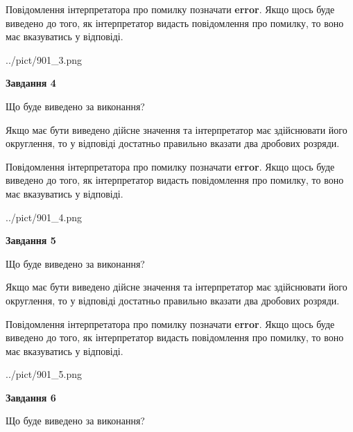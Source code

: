 \documentclass[12pt, ukrainian]{article}
\begin{document}
{\begin {Large}
Повідомлення інтерпретатора про помилку позначати \textbf{error}.
Якщо щось буде виведено до того, як інтерпретатор видасть повідомлення про помилку, 
то воно має вказуватись у відповіді. \par

\begin{center}
	{../pict/901_3.png}
\end{center}
\newpage

{\begin {center}\textbf{Завдання 4}\end {center}}\par
Що буде виведено за виконання? \par

Якщо має бути виведено дійсне значення та інтерпретатор має здійснювати його округлення, 
то у відповіді достатньо правильно вказати два дробових розряди.

Повідомлення інтерпретатора про помилку позначати \textbf{error}.
Якщо щось буде виведено до того, як інтерпретатор видасть повідомлення про помилку, 
то воно має вказуватись у відповіді. \par

\begin{center}
	{../pict/901_4.png}
\end{center}
\newpage

{\begin {center}\textbf{Завдання 5}\end {center}}\par
Що буде виведено за виконання? \par

Якщо має бути виведено дійсне значення та інтерпретатор має здійснювати його округлення, 
то у відповіді достатньо правильно вказати два дробових розряди.

Повідомлення інтерпретатора про помилку позначати \textbf{error}.
Якщо щось буде виведено до того, як інтерпретатор видасть повідомлення про помилку, 
то воно має вказуватись у відповіді. \par

\begin{center}
	{../pict/901_5.png}
\end{center}
\newpage

{\begin {center}\textbf{Завдання 6}\end {center}}\par
Що буде виведено за виконання? \par


\end{Large}}
\end{document}

